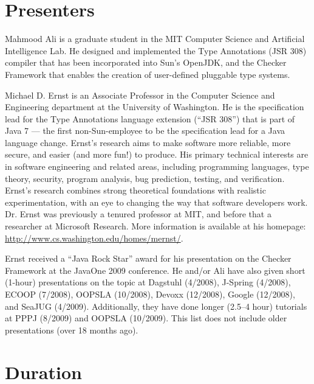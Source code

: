 \documentclass{sig-alternate} %
\begin{document}
% 
% 

\section{Presenters}

Mahmood Ali is a graduate student in the MIT Computer Science and
Artificial Intelligence Lab.  He designed and implemented the Type
Annotations (JSR 308) compiler that has been incorporated into Sun's
OpenJDK, and the Checker Framework that enables the creation of
user-defined pluggable type systems.

Michael D. Ernst is an Associate Professor in the Computer Science and
Engineering department at the University of Washington.  He is the
specification lead for the Type Annotations language extension (``JSR
308'') that is part of Java 7 --- the first non-Sun-employee to be the
specification lead for a Java language change.  Ernst's research aims to
make software more reliable, more secure, and easier (and more fun!) to
produce. His primary technical interests are in software engineering and
related areas, including programming languages, type theory, security,
program analysis, bug prediction, testing, and verification. Ernst's
research combines strong theoretical foundations with realistic
experimentation, with an eye to changing the way that software developers
work.  Dr. Ernst was previously a tenured professor at MIT, and before that
a researcher at Microsoft Research.  More information is available at his
homepage:  \url{http://www.cs.washington.edu/homes/mernst/}.

Ernst received a ``Java Rock Star'' award for his presentation on the
Checker Framework at the JavaOne 2009 conference.  He and/or Ali have also
given short (1-hour) presentations on the topic at Dagstuhl (4/2008),
J-Spring (4/2008), ECOOP (7/2008), OOPSLA (10/2008), Devoxx (12/2008),
Google (12/2008), and SeaJUG (4/2009).  Additionally, they have done longer
(2.5--4 hour) tutorials at PPPJ (8/2009) and OOPSLA (10/2009).  This list
does not include older presentations (over 18 months ago).


\section{Duration}
\end{document}
